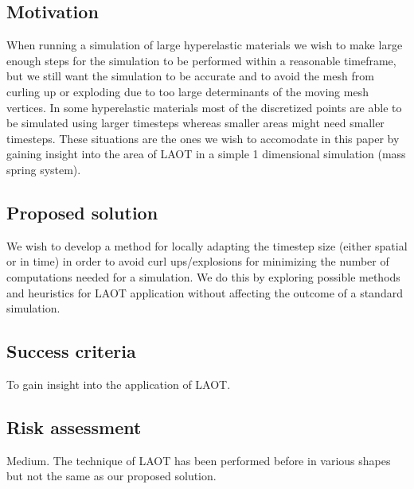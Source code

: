 \documentclass[11pt,a4paper]{article}
\begin{document}
\subsection{Motivation}
When running a simulation of large hyperelastic materials we wish to make
large enough steps for the simulation to be performed within a reasonable
timeframe, but we still want the simulation to be accurate and to avoid
the mesh from curling up or exploding due to too large determinants of the
moving mesh vertices. In some hyperelastic materials most of the
discretized points are able to be simulated using larger timesteps whereas
smaller areas might need smaller timesteps. These situations are the ones
we wish to accomodate in this paper by gaining insight into the area of LAOT in
a simple 1 dimensional simulation (mass spring system).

\subsection{Proposed solution}
We wish to develop a method for locally adapting the timestep size (either
spatial or in time) in
order to avoid curl ups/explosions for minimizing the number of computations
needed for a simulation. We do this by exploring possible methods and heuristics
for LAOT application without affecting the outcome of a standard simulation.

\subsection{Success criteria}
To gain insight into the application of LAOT.

\subsection{Risk assessment}
Medium. The technique of LAOT has been performed before in various shapes but
not the same as our proposed solution.
\end{document}
